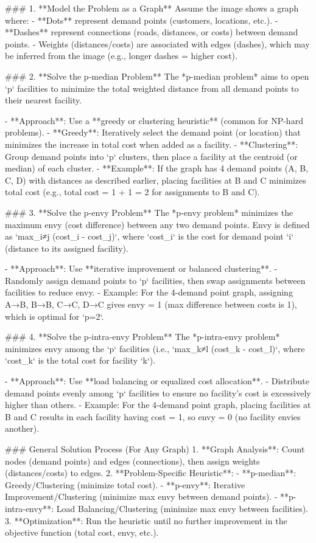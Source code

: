 ### 1. **Model the Problem as a Graph**  
Assume the image shows a graph where:  
- **Dots** represent demand points (customers, locations, etc.).  
- **Dashes** represent connections (roads, distances, or costs) between demand points.  
- Weights (distances/costs) are associated with edges (dashes), which may be inferred from the image (e.g., longer dashes = higher cost).  


### 2. **Solve the p-median Problem**  
The *p-median problem* aims to open `p` facilities to minimize the total weighted distance from all demand points to their nearest facility.  

- **Approach**: Use a **greedy or clustering heuristic** (common for NP-hard problems).  
  - **Greedy**: Iteratively select the demand point (or location) that minimizes the increase in total cost when added as a facility.  
  - **Clustering**: Group demand points into `p` clusters, then place a facility at the centroid (or median) of each cluster.  
  - **Example**: If the graph has 4 demand points (A, B, C, D) with distances as described earlier, placing facilities at B and C minimizes total cost (e.g., total cost = 1 + 1 = 2 for assignments to B and C).  


### 3. **Solve the p-envy Problem**  
The *p-envy problem* minimizes the maximum envy (cost difference) between any two demand points. Envy is defined as `max_{i≠j} (cost_i - cost_j)`, where `cost_i` is the cost for demand point `i` (distance to its assigned facility).  

- **Approach**: Use **iterative improvement or balanced clustering**.  
  - Randomly assign demand points to `p` facilities, then swap assignments between facilities to reduce envy.  
  - Example: For the 4-demand point graph, assigning A→B, B→B, C→C, D→C gives envy = 1 (max difference between costs is 1), which is optimal for `p=2`.  


### 4. **Solve the p-intra-envy Problem**  
The *p-intra-envy problem* minimizes envy among the `p` facilities (i.e., `max_{k≠l} (cost_k - cost_l)`, where `cost_k` is the total cost for facility `k`).  

- **Approach**: Use **load balancing or equalized cost allocation**.  
  - Distribute demand points evenly among `p` facilities to ensure no facility’s cost is excessively higher than others.  
  - Example: For the 4-demand point graph, placing facilities at B and C results in each facility having cost = 1, so envy = 0 (no facility envies another).  


### General Solution Process (For Any Graph)  
1. **Graph Analysis**: Count nodes (demand points) and edges (connections), then assign weights (distances/costs) to edges.  
2. **Problem-Specific Heuristic**:  
   - **p-median**: Greedy/Clustering (minimize total cost).  
   - **p-envy**: Iterative Improvement/Clustering (minimize max envy between demand points).  
   - **p-intra-envy**: Load Balancing/Clustering (minimize max envy between facilities).  
3. **Optimization**: Run the heuristic until no further improvement in the objective function (total cost, envy, etc.).  


